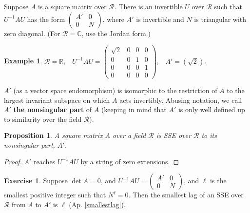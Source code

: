 \documentclass{amsart}
\newcommand{\si}{\index}
\newtheorem{prop}[equation]{Proposition}
\theoremstyle{definition}
\newtheorem{ex}[equation]{Example}
\newtheorem{exer}[equation]{Exercise}
\theoremstyle{definition}
\newcommand{\apr}{(Ap. \ref}
\newcommand{\R}{\mathbb R}
\newcommand{\C}{\mathbb C}
\numberwithin{equation}{subsection}
\begin{document}
     Suppose
     $A$ is a square matrix over $\mathcal R$.
     There is an invertible $U$ over $\mathcal R$ such that
     $U^{-1}AU$ has the form
     $\begin{pmatrix} A' & 0 \\ 0 &N \end{pmatrix}$,
     where $A'$ is invertible and $N$ is triangular with zero
     diagonal.
     (For $\mathcal R=\C$, use the Jordan form.)
\begin{ex}
        $\mathcal R=\R$,  $\ \ \ U^{-1}AU =
        \begin{pmatrix} \sqrt 2 &0&0&0 \\ 0&0&1&0 \\ 0&0&0&1 \\
          0&0&0&0 \end{pmatrix}$, $\ \ \ A'=(\sqrt 2)$.
       \end{ex}
      $A'$ (as a vector space endomorphism) is
     isomorphic to  the restriction of $A$ to the largest
     invariant subspace on
     which $A$ acts invertibly. Abusing notation, we
     call $A'$ {\bf the nonsingular
     part} of $A$ (keeping in mind that $A'$ is only well defined
     up to similarity over the field $\mathcal R$).
\begin{prop} A square matrix $A$ over a field $\mathcal R$
   is SSE over $\mathcal R$ to its
   nonsingular part, $A'$.
\end{prop}
\begin{proof}
$A'$ reaches $U^{-1}AU$ by a string of zero
     extensions.
\end{proof}
\begin{exer} Suppose $\det A =0$, and $U^{-1}AU
=\begin{pmatrix} A' & 0 \\ 0 &N \end{pmatrix}$, and
$\ell$ is the smallest positive integer such that $N^{\ell}=0$.
Then the smallest lag\si{lag} of an SSE over $\mathcal R$
from $A$ to $A'$ is $\ell $ \apr{smallestlag}).
\end{exer}
\end{document}
